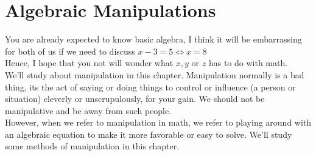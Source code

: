 \chapter{Algebraic Manipulations}
You are already expected to know basic algebra, I think it will be embarrassing for both of us if we need to discuss $x-3=5 \iff x=8$\\ Hence, I hope that you not will wonder what $x,y$ or $z$ has to do with math.\\
We'll study about manipulation in this chapter. Manipulation normally is a bad thing, its the act of saying or doing things to control or influence (a person or situation) cleverly or unscrupulously, for your gain. We should not be manipulative and be away from such people.\\
However, when we refer to manipulation in math, we refer to playing around with an algebraic equation to make it more favorable or easy to solve. We'll study some methods of manipulation in this chapter.\\
